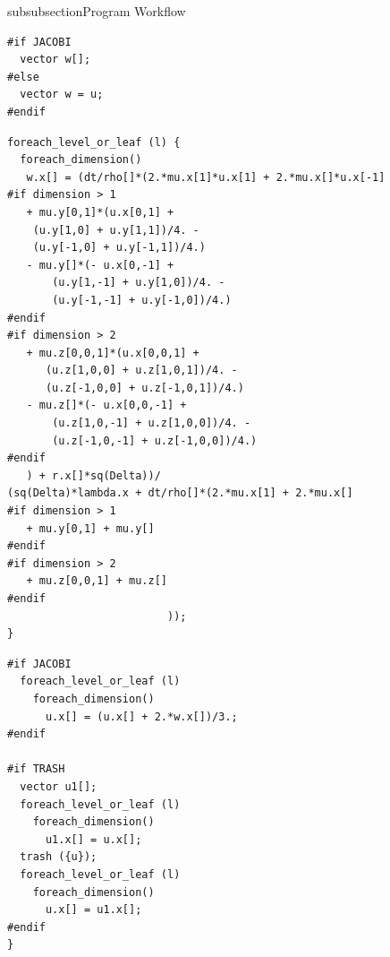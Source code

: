 \begin{codesection}{subsubsection}{Program Workflow}
\begin{verbatim}
#if JACOBI
  vector w[];
#else
  vector w = u;
#endif
\end{verbatim}
\codearrow
{}
\begin{verbatim}
foreach_level_or_leaf (l) {
  foreach_dimension()
   w.x[] = (dt/rho[]*(2.*mu.x[1]*u.x[1] + 2.*mu.x[]*u.x[-1]
#if dimension > 1
   + mu.y[0,1]*(u.x[0,1] +
    (u.y[1,0] + u.y[1,1])/4. -
    (u.y[-1,0] + u.y[-1,1])/4.)
   - mu.y[]*(- u.x[0,-1] +
       (u.y[1,-1] + u.y[1,0])/4. -
       (u.y[-1,-1] + u.y[-1,0])/4.)
#endif
#if dimension > 2
   + mu.z[0,0,1]*(u.x[0,0,1] +
      (u.z[1,0,0] + u.z[1,0,1])/4. -
      (u.z[-1,0,0] + u.z[-1,0,1])/4.)
   - mu.z[]*(- u.x[0,0,-1] +
       (u.z[1,0,-1] + u.z[1,0,0])/4. -
       (u.z[-1,0,-1] + u.z[-1,0,0])/4.)
#endif
   ) + r.x[]*sq(Delta))/
(sq(Delta)*lambda.x + dt/rho[]*(2.*mu.x[1] + 2.*mu.x[]
#if dimension > 1
   + mu.y[0,1] + mu.y[]
#endif
#if dimension > 2
   + mu.z[0,0,1] + mu.z[]
#endif
                         ));
}
\end{verbatim}
\codearrow
{}
\begin{verbatim}
#if JACOBI
  foreach_level_or_leaf (l)
    foreach_dimension()
      u.x[] = (u.x[] + 2.*w.x[])/3.;
#endif
  
#if TRASH
  vector u1[];
  foreach_level_or_leaf (l)
    foreach_dimension()
      u1.x[] = u.x[];
  trash ({u});
  foreach_level_or_leaf (l)
    foreach_dimension()
      u.x[] = u1.x[];
#endif
}
\end{verbatim}
\end{codesection}

\subsection{}\label{sec:viscosity-resi}
